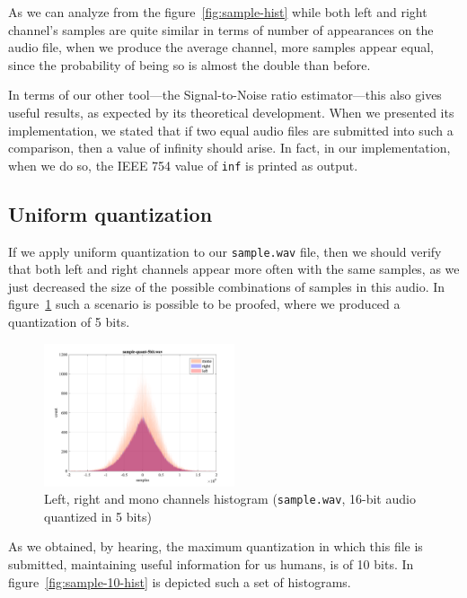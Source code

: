 \documentclass[conference]{IEEEtran}
\begin{document}
As we can analyze from the figure~\ref{fig:sample-hist} while both left and right channel's samples are quite similar in terms of number of appearances on the audio file, when we produce the average channel, more samples appear equal, since the probability of being so is almost the double than before.

In terms of our other tool—the Signal-to-Noise ratio estimator—this also gives useful results, as expected by its theoretical development. When we presented its implementation, we stated that if two equal audio files are submitted into such a comparison, then a value of infinity should arise. In fact, in our implementation, when we do so, the IEEE 754 value of \texttt{inf} is printed as output. 

\subsection{Uniform quantization}

If we apply uniform quantization to our \texttt{sample.wav} file, then we should verify that both left and right channels appear more often with the same samples, as we just decreased the size of the possible combinations of samples in this audio. In figure~\ref{fig:sample-5-hist} such a scenario is possible to be proofed, where we produced a quantization of 5 bits.

\begin{figure}
	\centering
	\includegraphics[width=0.5\textwidth]{figs/5-hist.png}
	\caption{Left, right and mono channels histogram (\texttt{sample.wav}, 16-bit audio quantized in 5 bits)}
    \label{fig:sample-5-hist}
\end{figure}

As we obtained, by hearing, the maximum quantization in which this file is submitted, maintaining useful information for us humans, is of 10 bits. In figure~\ref{fig:sample-10-hist} is depicted such a set of histograms.
\end{document}
